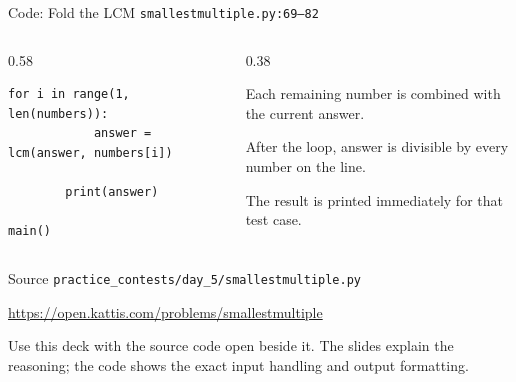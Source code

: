\documentclass[aspectratio=169,11pt]{beamer}
\begin{document}
\begin{frame}[fragile]{Code: Fold the LCM}
\scriptsize
{} \texttt{smallestmultiple.py:69--82}

\vspace{0.08cm}
\begin{columns}[T,totalwidth=\textwidth]
\begin{column}{0.58\textwidth}
\begin{lstlisting}[style=cpcode]
        for i in range(1, len(numbers)):
            answer = lcm(answer, numbers[i])

        print(answer)

main()
\end{lstlisting}
\end{column}
\begin{column}{0.38\textwidth}
\begin{tightitemize}
  \item Each remaining number is combined with the current answer.
  \item After the loop, answer is divisible by every number on the line.
  \item The result is printed immediately for that test case.
\end{tightitemize}
\end{column}
\end{columns}
\end{frame}

\begin{frame}{Source}
\small
{} \texttt{practice\_contests/day\_5/smallestmultiple.py}

\vspace{0.3cm}
 \url{https://open.kattis.com/problems/smallestmultiple}

\vspace{0.45cm}
Use this deck with the source code open beside it. The slides explain the reasoning; the code shows the exact input handling and output formatting.
\end{frame}
\end{document}
